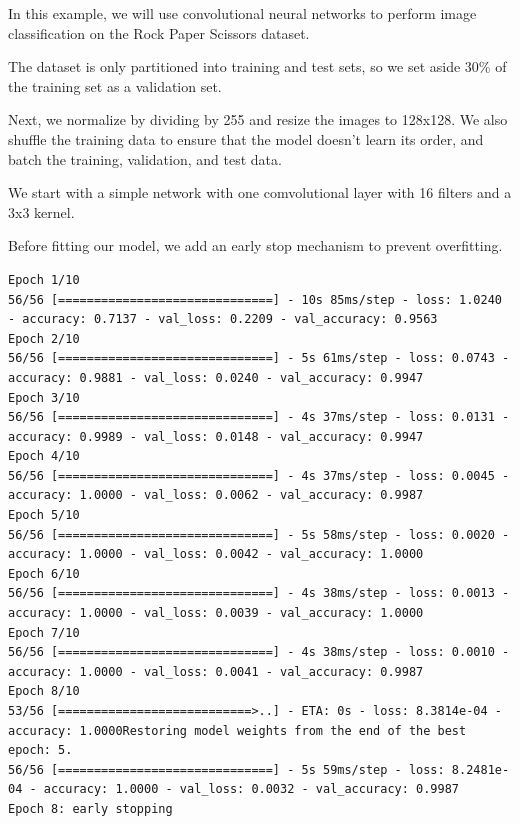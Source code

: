 \documentclass{article}
\begin{document}
In this example, we will use convolutional neural networks to perform image classification on the Rock Paper Scissors dataset. 



The dataset is only partitioned into training and test sets, so we set aside 30\% of the training set as a validation set.



Next, we normalize by dividing by 255 and resize the images to 128x128. We also shuffle the training data to ensure that the model doesn't learn its order, and batch the training, validation, and test data.



We start with a simple network with one comvolutional layer with 16 filters and a 3x3 kernel.



Before fitting our model, we add an early stop mechanism to prevent overfitting.



\begin{lstlisting}[style=output]
Epoch 1/10
56/56 [==============================] - 10s 85ms/step - loss: 1.0240 - accuracy: 0.7137 - val_loss: 0.2209 - val_accuracy: 0.9563
Epoch 2/10
56/56 [==============================] - 5s 61ms/step - loss: 0.0743 - accuracy: 0.9881 - val_loss: 0.0240 - val_accuracy: 0.9947
Epoch 3/10
56/56 [==============================] - 4s 37ms/step - loss: 0.0131 - accuracy: 0.9989 - val_loss: 0.0148 - val_accuracy: 0.9947
Epoch 4/10
56/56 [==============================] - 4s 37ms/step - loss: 0.0045 - accuracy: 1.0000 - val_loss: 0.0062 - val_accuracy: 0.9987
Epoch 5/10
56/56 [==============================] - 5s 58ms/step - loss: 0.0020 - accuracy: 1.0000 - val_loss: 0.0042 - val_accuracy: 1.0000
Epoch 6/10
56/56 [==============================] - 4s 38ms/step - loss: 0.0013 - accuracy: 1.0000 - val_loss: 0.0039 - val_accuracy: 1.0000
Epoch 7/10
56/56 [==============================] - 4s 38ms/step - loss: 0.0010 - accuracy: 1.0000 - val_loss: 0.0041 - val_accuracy: 0.9987
Epoch 8/10
53/56 [===========================>..] - ETA: 0s - loss: 8.3814e-04 - accuracy: 1.0000Restoring model weights from the end of the best epoch: 5.
56/56 [==============================] - 5s 59ms/step - loss: 8.2481e-04 - accuracy: 1.0000 - val_loss: 0.0032 - val_accuracy: 0.9987
Epoch 8: early stopping
\end{lstlisting}
\end{document}
